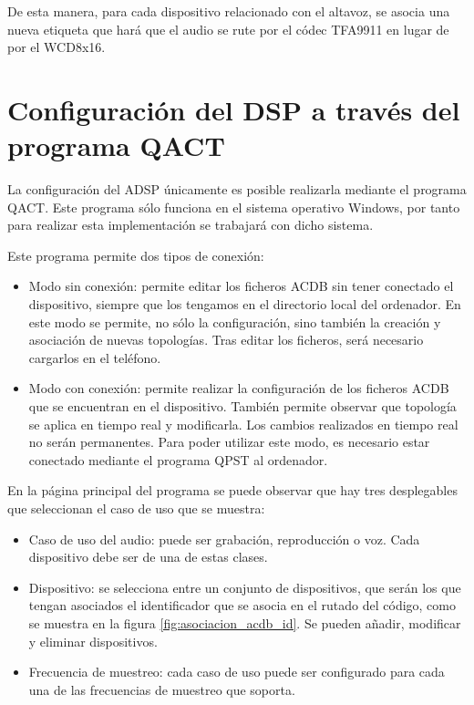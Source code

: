 De esta manera, para cada dispositivo relacionado con el altavoz, se asocia una nueva etiqueta que hará que el audio se rute por el códec TFA9911 en lugar de por el WCD8x16.

\section{Configuración del DSP a través del programa QACT} \label{sec:conf_DSP}
La configuración del \gls{ADSP} únicamente es posible realizarla mediante el programa \gls{QACT}. Este programa sólo funciona en el sistema operativo Windows, por tanto para realizar esta implementación se trabajará con dicho sistema.

Este programa permite dos tipos de conexión:
\begin{itemize}
	\item{Modo sin conexión: permite editar los ficheros \gls{ACDB} sin tener conectado el dispositivo, siempre que los tengamos en el directorio local del ordenador. En este modo se permite, no sólo la configuración, sino también la creación y asociación de nuevas topologías. Tras editar los ficheros, será necesario cargarlos en el teléfono.}
	\item{Modo con conexión: permite realizar la configuración de los ficheros \gls{ACDB} que se encuentran en el dispositivo. También permite observar que topología se aplica en tiempo real y modificarla. Los cambios realizados en tiempo real no serán permanentes. Para poder utilizar este modo, es necesario estar conectado mediante el programa \gls{QPST} al ordenador.}
\end{itemize}

En la página principal del programa se puede observar que hay tres desplegables que seleccionan el caso de uso que se muestra:
\begin{itemize}
	\item{Caso de uso del audio: puede ser grabación, reproducción o voz. Cada dispositivo debe ser de una de estas clases.}
	\item{Dispositivo: se selecciona entre un conjunto de dispositivos, que serán los que tengan asociados el identificador que se asocia en el rutado del código, como se muestra en la figura \ref{fig:asociacion_acdb_id}. Se pueden añadir, modificar y eliminar dispositivos.}
	\item{Frecuencia de muestreo: cada caso de uso puede ser configurado para cada una de las frecuencias de muestreo que soporta.}
\end{itemize}

